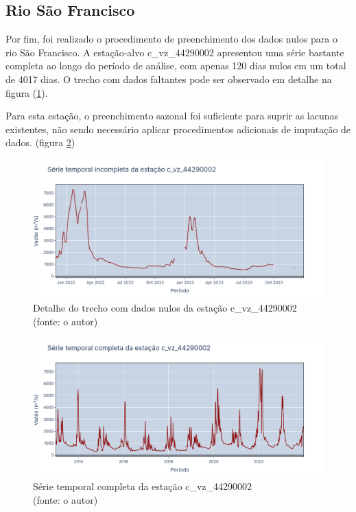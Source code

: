 \subsection{Rio São Francisco}

Por fim, foi realizado o procedimento de preenchimento dos dados nulos para o rio São Francisco. A estação-alvo c\_vz\_44290002 apresentou uma série bastante completa ao longo do período de análise, com apenas 120 dias nulos em um total de 4017 dias. O trecho com dados faltantes pode ser observado em detalhe na figura (\ref{fig:franciscoSerieIncompleta_c_vz_44290002-detalhe}).

Para esta estação, o preenchimento sazonal foi suficiente para suprir as lacunas existentes, não sendo necessário aplicar procedimentos adicionais de imputação de dados. (figura \ref{fig:franciscoSerieCompleta_c_vz_44290002})

\begin{figure}[!h]
	\centering
	\includegraphics[scale=0.25]{Figuras/rio_sao_francisco/franciscoSerieIncompleta_c_vz_44290002-detalhe.png}
	\caption{Detalhe do trecho com dados nulos da estação c\_vz\_44290002\\(fonte: o autor)}
	\label{fig:franciscoSerieIncompleta_c_vz_44290002-detalhe}
\end{figure}

\begin{figure}[!h]
	\centering
	\includegraphics[scale=0.25]{Figuras/rio_sao_francisco/franciscoSerieCompleta_c_vz_44290002.png}
	\caption{Série temporal completa da estação c\_vz\_44290002\\(fonte: o autor)}
	\label{fig:franciscoSerieCompleta_c_vz_44290002}
\end{figure}
\clearpage

